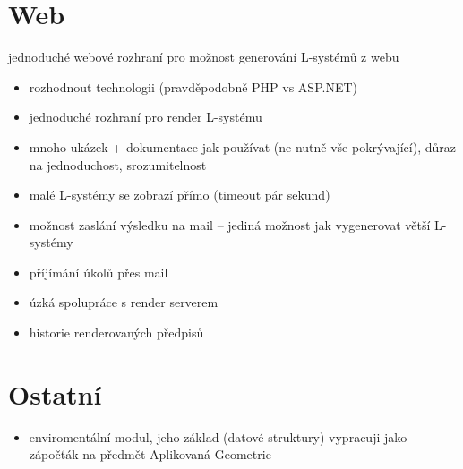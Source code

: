 \documentclass[12pt, a4paper]{article}
\begin{document}
\section{Web}
jednoduché webové rozhraní pro možnost generování L-systémů z webu

\begin{itemize}
	\item rozhodnout technologii (pravděpodobně PHP vs ASP.NET)
	
	\item jednoduché rozhraní pro render L-systému
	
	\item mnoho ukázek + dokumentace jak používat (ne nutně vše-pokrývající), důraz na jednoduchost, srozumitelnost
	
	\item malé L-systémy se zobrazí přímo (timeout pár sekund)
	
	\item možnost zaslání výsledku na mail -- jediná možnost jak vygenerovat větší L-systémy
	
	\item příjímání úkolů přes mail
	
	\item úzká spolupráce s render serverem
	
	\item historie renderovaných předpisů
\end{itemize}


\section{Ostatní}
\begin{itemize}
	\item enviromentální modul, jeho základ (datové struktury) vypracuji jako zápočťák na předmět Aplikovaná Geometrie
\end{itemize}
\end{document}
